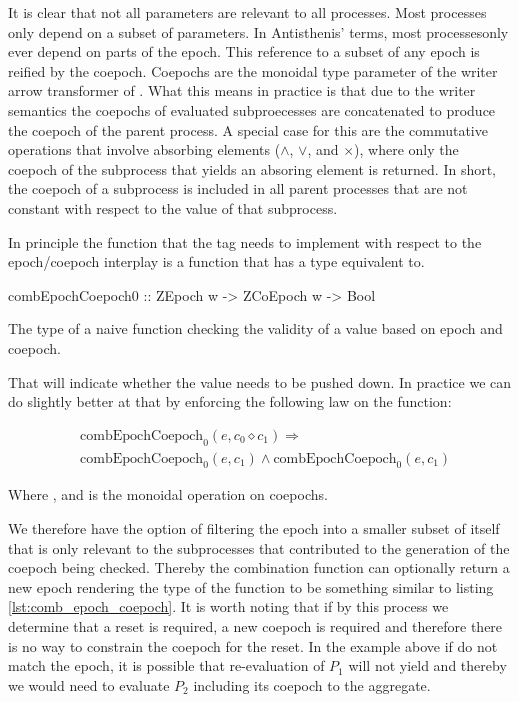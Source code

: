 It is clear that not all parameters are relevant to all processes.
Most processes only depend on a subset of parameters. In Antisthenis'
terms, most processesonly ever depend on parts of the epoch. This
reference to a subset of any epoch is reified by the coepoch. Coepochs
are the monoidal type parameter of the writer arrow transformer of
. What this means in practice is that due to the writer
semantics the coepochs of evaluated subproecesses are concatenated to
produce the coepoch of the parent process. A special case for this are
the commutative operations that involve absorbing elements (\(\land\),
\(\lor\), and \(\times\)), where only the coepoch of the subprocess
that yields an absoring element is returned. In short, the coepoch of
a subprocess is included in all parent processes that are not constant
with respect to the value of that subprocess.

In principle the function that the  tag needs to
implement with respect to the epoch/coepoch interplay is a function
that has a type equivalent to.

\begin{code}
\begin{haskellcode}
combEpochCoepoch0 :: ZEpoch w -> ZCoEpoch w -> Bool
\end{haskellcode}
\caption{The type of a naive function checking the validity of a value
  based on epoch and coepoch.}
\end{code}

That will indicate whether the value needs to be pushed down. In
practice we can do slightly better at that by enforcing the following
law on the  function:

\begin{align*}
& \text{combEpochCoepoch}_0(e, c_0 \diamond c_1) \Rightarrow \\
& \text{combEpochCoepoch}_0(e,c_1) \land \text{combEpochCoepoch}_0(e,c_1)
\end{align*}

Where ,  and \hask{<>} is the monoidal
operation on coepochs.

We therefore have the option of filtering the epoch into a smaller
subset of itself that is only relevant to the subprocesses that
contributed to the generation of the coepoch being checked. Thereby
the combination function can optionally return a new epoch rendering
the type of the function to be something similar to listing
\ref{lst:comb_epoch_coepoch}. It is worth noting that if by this
process we determine that a reset is required, a new coepoch is
required and therefore there is no way to constrain the coepoch for
the reset. In the example above if  do not
match the epoch, it is possible that re-evaluation of \(P_1\) will not
yield  and thereby we would need to evaluate \(P_2\)
including its coepoch to the aggregate.

